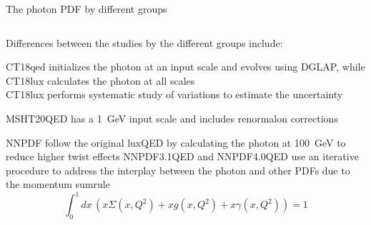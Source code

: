 \documentclass[aspectratio=169, 8pt,t]{beamer}
\begin{document}
\begin{frame}{The photon PDF by different groups}
  \begin{columns}[T]
    \begin{column}{0.59\textwidth}


      Differences between the studies by the different groups include:

      \vspace*{1em}
      CT18qed initializes the photon at an input scale and evolves using DGLAP, while CT18lux calculates the photon at all scales\\

      \vspace*{0.5em}
      CT18lux performs systematic study of variations to estimate the uncertainty

      \vspace*{1em}
      MSHT20QED has a 1~GeV input scale and includes renormalon corrections

      \vspace*{1em}
      NNPDF follow the original luxQED by calculating the photon at 100~GeV to reduce higher twist effects
      \vspace*{0.5em}
      NNPDF3.1QED and NNPDF4.0QED use an iterative procedure to address the interplay between the photon and other PDFs due to the momentum sumrule
      \begin{equation*}
        \int_0^1 dx\, \left(  x\Sigma(x,Q^2) + xg(x,Q^2) + x\gamma(x,Q^2) \right) =1
      \end{equation*}
    \end{column}


\end{columns}
\end{frame}
\end{document}
